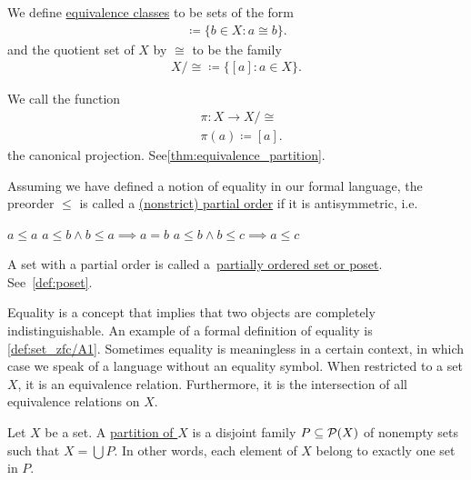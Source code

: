 \begin{definition}
\begin{defenum}
    We define \uline{equivalence classes} to be sets of the form
    \begin{align*}
      [a] \coloneqq \{ b \in X \colon a \cong b \}.
    \end{align*}
    and the quotient set of $X$ by $\cong$ to be the family
    \begin{align*}
      X / \cong \coloneqq \{ [a] \colon a \in X \}.
    \end{align*}

    We call the function
    \begin{align*}
      &\pi: X \to X / \cong \\
      &\pi(a) \coloneqq [a].
    \end{align*}
    the canonical projection. See\cref{thm:equivalence_partition}.

    \item\label{def:order/partial} Assuming we have defined a notion of equality in our formal language, the preorder $\leq$ is called a \uline{(nonstrict) partial order} if it is antisymmetric, i.e.
    \begin{description}
       $a \leq a$
       $a \leq b \land b \leq a \implies a = b$
       $a \leq b \land b \leq c \implies a \leq c$
    \end{description}

    A set with a partial order is called a~\uline{partially ordered set or poset}. See~\cref{def:poset}.
  \end{defenum}
\end{definition}

\begin{note}\label{note:equality_equivalence_relation}
  Equality is a concept that implies that two objects are completely indistinguishable. An example of a formal definition of equality is \cref{def:set_zfc/A1}. Sometimes equality is meaningless in a certain context, in which case we speak of a language without an equality symbol. When restricted to a set $X$, it is an equivalence relation. Furthermore, it is the intersection of all equivalence relations on $X$.
\end{note}

\begin{definition}\label{def:set_partition}
  Let $X$ be a set. A \uline{partition of $X$} is a disjoint family $P \subseteq \operatorname{\mathcal P}(X)$ of nonempty sets such that $X = \bigcup P$. In other words, each element of $X$ belong to exactly one set in $P$.
\end{definition}

